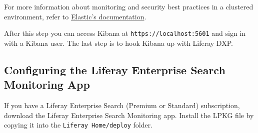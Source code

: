 For more information about monitoring and security best practices in a
clustered environment, refer to
\href{https://www.elastic.co/guide/en/x-pack/6.1/secure-monitoring.html}{Elastic's
documentation}.

After this step you can access Kibana at \texttt{https://localhost:5601}
and sign in with a Kibana user. The last step is to hook Kibana up with
Liferay DXP.

\subsection{Configuring the Liferay Enterprise Search Monitoring
App}\label{configuring-the-liferay-enterprise-search-monitoring-app-1}

If you have a Liferay Enterprise Search (Premium or Standard)
subscription, download the Liferay Enterprise Search Monitoring app.
Install the LPKG file by copying it into the
\texttt{Liferay\ Home/deploy} folder.

